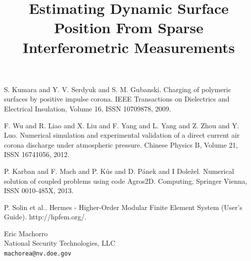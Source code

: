 \documentclass[article, A4, 11pt]{llncs}%
\begin{document}

\begin{thebibliography}{10}
{\sc S. Kumara and Y. V. Serdyuk and S. M. Gubanski}. {Charging of polymeric surfaces by positive impulse corona}. IEEE Transactions on Dielectrics and Electrical Insulation, Volume 16, ISSN 10709878, 2009.

{\sc F. Wu and R. Liao and X. Liu and F. Yang and L. Yang and Z. Zhou and Y. Luo}. {Numerical simulation and experimental validation of a direct current air corona discharge under atmospheric pressure}. Chinese Physics B, Volume 21, ISSN 16741056, 2012.

{\sc P. Karban and F. Mach and P. K\r{u}s and D. P\'{a}nek and I Dole\v{z}el}. {Numerical solution of coupled problems using code Agros2D}. Computing, Springer Vienna, ISSN 0010-485X, 2013.

{\sc P. Solin et al.}. {Hermes - Higher-Order Modular Finite Element System (User's Guide)}. http://hpfem.org/.
\end{thebibliography} %

\title{Estimating Dynamic Surface Position From Sparse Interferometric Measurements}
 \author{} \institute{}
\maketitle
\begin{center}
{\large Eric Machorro}\\
National Security Technologies, LLC\\
{\tt machorea@nv.doe.gov}
\end{center}
\end{document}
